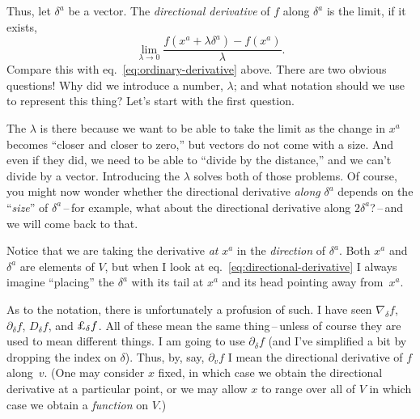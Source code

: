 \documentclass[10pt, a4paper]{article}
\begin{document}
Thus, let $\delta^a$ be a vector. The \emph{directional derivative} of $f$
along $\delta^a$ is the limit, if it exists,
\begin{equation*}
  \lim_{\lambda\to0} \frac{f(x^a+\lambda \delta^a) - f(x^a)}{\lambda}.
  \label{eq:directional-derivative}
\end{equation*}
Compare this with eq.~\ref{eq:ordinary-derivative} above. There are
two obvious questions! Why did we introduce a number, $\lambda$; and what
notation should we use to represent this thing? Let's start with the
first question.

The $\lambda$ is there because we want to be able to take the limit as the
change in $x^a$ becomes “closer and closer to zero,” but vectors do
not come with a size. And even if they did, we need to be able to
“divide by the distance,” and we can't divide by a vector. Introducing
the $\lambda$ solves both of those problems. Of course, you might now wonder
whether the directional derivative \emph{along} $\delta^a$ depends on the
“\emph{size}” of $\delta^a$\,--\,for example, what about the directional
derivative along $2\delta^a$?\,--\,and we will come back to that.

Notice that we are taking the derivative \emph{at} $x^a$ in the
\emph{direction} of $\delta^a$. Both $x^a$ and $\delta^a$ are elements of $V$,
but when I look at eq.~\ref{eq:directional-derivative} I always
imagine “placing” the $\delta^a$ with its tail at $x^a$ and its head
pointing away from~$x^a$. 

As to the notation, there is unfortunately a profusion of such. I have
seen $\nabla_\delta f$, $\partial_\delta f$, $D_\delta f$, and
$\text{\pounds}_\delta f$. All of these mean the same thing\,--\,unless of
course they are used to mean different things. I am going to use
$\partial_\delta f$ (and I've simplified a bit by dropping the index on
$\delta$). Thus, by, say, $\partial_v f$ I mean the directional derivative of
$f$ along~$v$. (One may consider $x$ fixed, in which case we obtain
the directional derivative at a particular point, or we may allow $x$
to range over all of $V$ in which case we obtain a \emph{function} on
$V$.)
\end{document}

